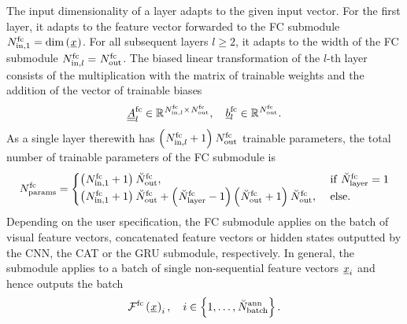 The input dimensionality of a layer
adapts to the given input vector.
For the first layer,
it adapts to the feature vector
forwarded to the FC submodule
$
\num[]{\fc}{\inp,1}{}{} 
= 
\dim \left(\featvec[]{}{}{}{}\right)$.
For all subsequent layers $l \ge 2$,
it adapts to
the width of the FC submodule
$
\num[]{\fc}{\inp,l}{}{} 
= \num[]{\fc}{\outp}{}{}
$.
The biased linear transformation of the $l$-th layer
consists of the multiplication with the matrix of trainable weights
and the addition of the vector of trainable biases
\begin{equation}
    \underline{\underline A}^\fc_l
    \in 
    \mathbb{R}^{
        \num[]{\fc}{\inp,l}{}{}
        \times
        \num[]{\fc}{\outp}{}{}
    }, \quad
    \underline b^\text{fc}_l 
    \in \mathbb{R}^{
        \num[]{\fc}{\outp}{}{}
    }.
\end{equation}
As a single layer therewith has
$
\left( \num[]{\fc}{\inp,l}{}{} + 1 \right)
\num[]{\fc}{\outp}{}{}
$
trainable parameters,
the total number of trainable parameters of the FC submodule is
\begin{align}
    \num[]{\fc}{\params}{}{}
    = \begin{cases}
        \left( \num[]{\fc}{\inp,1}{}{} + 1 \right)
        \num[\user]{\fc}{\outp}{}{}
        ,& \text{ if } \num[\user]{\fc}{\layer}{}{} = 1
        \\
        \left( \num[]{\fc}{\inp,1}{}{} + 1 \right)
        \num[\user]{\fc}{\outp}{}{}
        +
        \left( \num[\user]{\fc}{\layer}{}{} - 1 \right)
        \left( \num[\user]{\fc}{\outp}{}{} + 1 \right)
        \num[\user]{\fc}{\outp}{}{}
        ,& \text{ else.}
    \end{cases}
\end{align}
Depending on the user specification,
the FC submodule applies 
on the batch of visual feature vectors,
concatenated feature vectors
or hidden states
outputted by the CNN, the CAT or the GRU submodule, respectively.
In general, the submodule applies 
to a batch of single non-sequential feature vectors $\featvec[]{}{i}{}{}$
and 
hence outputs the batch
\begin{equation}
    \mathcal{F}^\text{fc}\left(
        \featvec[]{}{}{}{}
    \right)_i
    , \quad 
    i \in \left\{1, \dots, \num[\user]{\ann}{\batch}{}{}\right\}
    .
\end{equation}



